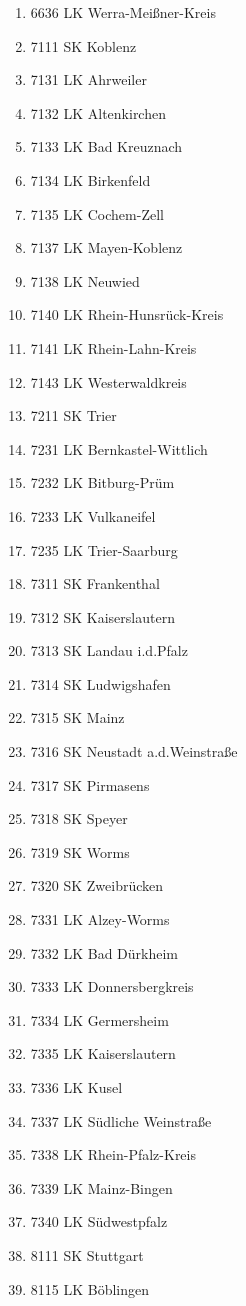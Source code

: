 \begin{enumerate}[itemsep=-6mm]
\item 6636 LK Werra-Meißner-Kreis
\item 7111 SK Koblenz
\item 7131 LK Ahrweiler
\item 7132 LK Altenkirchen
\item 7133 LK Bad Kreuznach
\item 7134 LK Birkenfeld
\item 7135 LK Cochem-Zell
\item 7137 LK Mayen-Koblenz
\item 7138 LK Neuwied
\item 7140 LK Rhein-Hunsrück-Kreis
\item 7141 LK Rhein-Lahn-Kreis
\item 7143 LK Westerwaldkreis
\item 7211 SK Trier
\item 7231 LK Bernkastel-Wittlich
\item 7232 LK Bitburg-Prüm
\item 7233 LK Vulkaneifel
\item 7235 LK Trier-Saarburg
\item 7311 SK Frankenthal
\item 7312 SK Kaiserslautern
\item 7313 SK Landau i.d.Pfalz
\item 7314 SK Ludwigshafen
\item 7315 SK Mainz
\item 7316 SK Neustadt a.d.Weinstraße
\item 7317 SK Pirmasens
\item 7318 SK Speyer
\item 7319 SK Worms
\item 7320 SK Zweibrücken
\item 7331 LK Alzey-Worms
\item 7332 LK Bad Dürkheim
\item 7333 LK Donnersbergkreis
\item 7334 LK Germersheim
\item 7335 LK Kaiserslautern
\item 7336 LK Kusel
\item 7337 LK Südliche Weinstraße
\item 7338 LK Rhein-Pfalz-Kreis
\item 7339 LK Mainz-Bingen
\item 7340 LK Südwestpfalz
\item 8111 SK Stuttgart
\item 8115 LK Böblingen

\end{enumerate}
